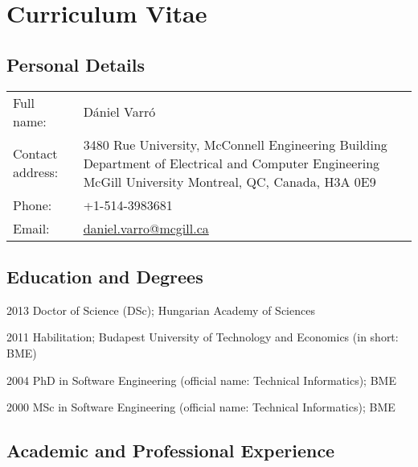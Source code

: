 \chapter{Curriculum Vitae}

\section{Personal Details}

\begin{tabular}{@{}lp{12cm}@{}}
\toprule
Full name:  & Dániel Varró \\ %
Contact address: &  3480 Rue University, McConnell Engineering Building \newline
Department of Electrical and Computer Engineering \newline
McGill University \newline
Montreal, QC, Canada, H3A 0E9\\ %
Phone: &  +1-514-3983681 \\ %
Email: &  \href{mailto:daniel.varro@mcgill.ca}{daniel.varro@mcgill.ca} \\ %
\bottomrule
\end{tabular}

\section{Education and Degrees}

\begin{yearlist}
\item[2013] Doctor of Science (DSc); Hungarian Academy of Sciences  
\item[2011] Habilitation; Budapest University of Technology and Economics (in short: BME) 
\item[2004] PhD in Software Engineering (official name: Technical Informatics); BME
\item[2000] MSc in Software Engineering (official name: Technical Informatics); BME 
\end{yearlist}



\section{Academic and Professional Experience}
